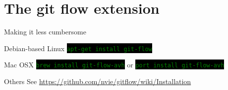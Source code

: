 \documentclass[
14pt,
aspectratio=169,
usenames,
dvipsnames,
x11names]{beamer}
\newcommand{\code}[1]{{\small\setlength{\fboxsep}{2pt}\colorbox{black}{\textcolor{green}{\texttt{#1}}}}}
\newcommand{\shadowbox}[2]{%
  \hbox{%
    \begin{tcolorbox}[beamer,
      width=#1,
      drop fuzzy shadow=black,
      arc=0pt,
      boxsep=0pt,
      left=0pt,right=0pt,top=0pt,bottom=0pt,
      ]%
      #2
    \end{tcolorbox}
  }
}
\begin{document}

\section{The git flow extension}

\begin{frame}{Making it less cumbersome}
  \begin{exampleblock}{Debian-based Linux}
    \code{apt-get install git-flow}
  \end{exampleblock}
  \begin{exampleblock}{Mac OSX}
    \code{brew install git-flow-avh}
    or
    \code{port install git-flow-avh}
  \end{exampleblock}
  \begin{exampleblock}{Others}
    See \url{https://github.com/nvie/gitflow/wiki/Installation}
  \end{exampleblock}
\end{frame}
\end{document}
